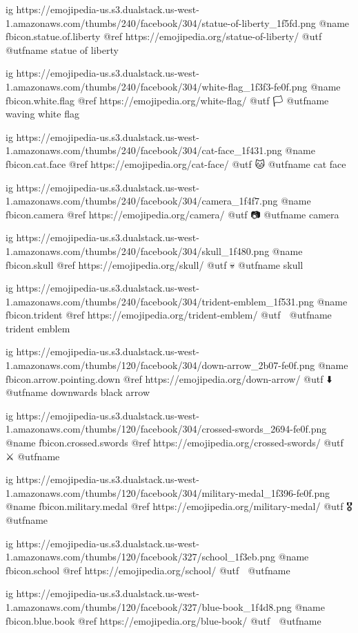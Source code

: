   ig https://emojipedia-us.s3.dualstack.us-west-1.amazonaws.com/thumbs/240/facebook/304/statue-of-liberty_1f5fd.png
  @name fbicon.statue.of.liberty
  @ref https://emojipedia.org/statue-of-liberty/
  @utf 🗽
  @utfname statue of liberty

  ig https://emojipedia-us.s3.dualstack.us-west-1.amazonaws.com/thumbs/240/facebook/304/white-flag_1f3f3-fe0f.png
  @name fbicon.white.flag
  @ref https://emojipedia.org/white-flag/
  @utf 🏳
  @utfname waving white flag

	ig https://emojipedia-us.s3.dualstack.us-west-1.amazonaws.com/thumbs/240/facebook/304/cat-face_1f431.png
	@name fbicon.cat.face
	@ref https://emojipedia.org/cat-face/
	@utf 🐱
	@utfname cat face

	ig https://emojipedia-us.s3.dualstack.us-west-1.amazonaws.com/thumbs/240/facebook/304/camera_1f4f7.png
	@name fbicon.camera
	@ref https://emojipedia.org/camera/
	@utf 📷
	@utfname camera

	ig https://emojipedia-us.s3.dualstack.us-west-1.amazonaws.com/thumbs/240/facebook/304/skull_1f480.png
	@name fbicon.skull
	@ref https://emojipedia.org/skull/
	@utf 💀
	@utfname skull

	ig https://emojipedia-us.s3.dualstack.us-west-1.amazonaws.com/thumbs/240/facebook/304/trident-emblem_1f531.png
	@name fbicon.trident
	@ref https://emojipedia.org/trident-emblem/
	@utf 🔱
	@utfname trident emblem

	ig https://emojipedia-us.s3.dualstack.us-west-1.amazonaws.com/thumbs/120/facebook/304/down-arrow_2b07-fe0f.png
	@name fbicon.arrow.pointing.down
	@ref https://emojipedia.org/down-arrow/
	@utf ⬇️
	@utfname downwards black arrow

	ig https://emojipedia-us.s3.dualstack.us-west-1.amazonaws.com/thumbs/120/facebook/304/crossed-swords_2694-fe0f.png
	@name fbicon.crossed.swords
	@ref https://emojipedia.org/crossed-swords/
	@utf ⚔️
	@utfname

	ig https://emojipedia-us.s3.dualstack.us-west-1.amazonaws.com/thumbs/120/facebook/304/military-medal_1f396-fe0f.png
	@name fbicon.military.medal
	@ref https://emojipedia.org/military-medal/
	@utf 🎖
	@utfname

	ig https://emojipedia-us.s3.dualstack.us-west-1.amazonaws.com/thumbs/120/facebook/327/school_1f3eb.png
	@name fbicon.school
	@ref https://emojipedia.org/school/
	@utf 🏫
	@utfname



	ig https://emojipedia-us.s3.dualstack.us-west-1.amazonaws.com/thumbs/120/facebook/327/blue-book_1f4d8.png
	@name fbicon.blue.book
	@ref https://emojipedia.org/blue-book/
	@utf 📘
	@utfname

